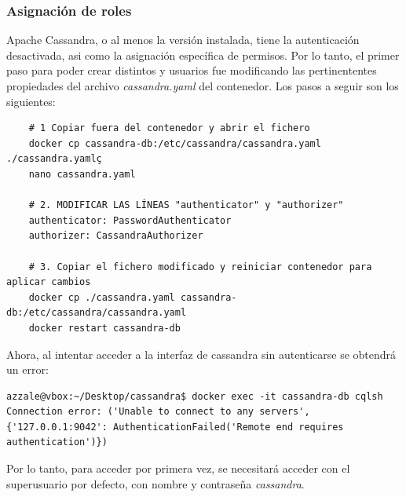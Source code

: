 \documentclass{article}
\begin{document}
\subsubsection{Asignación de roles}
Apache Cassandra, o al menos la versión instalada, tiene la autenticación desactivada, asi como la asignación específica de permisos. Por lo tanto, el primer paso para poder crear distintos y usuarios fue modificando las pertinententes propiedades del archivo \textit{cassandra.yaml} del contenedor. Los pasos a seguir son los siguientes:

\begin{lstlisting}
    # 1 Copiar fuera del contenedor y abrir el fichero
    docker cp cassandra-db:/etc/cassandra/cassandra.yaml ./cassandra.yamlç
    nano cassandra.yaml

    # 2. MODIFICAR LAS LÍNEAS "authenticator" y "authorizer"
    authenticator: PasswordAuthenticator
    authorizer: CassandraAuthorizer

    # 3. Copiar el fichero modificado y reiniciar contenedor para aplicar cambios
    docker cp ./cassandra.yaml cassandra-db:/etc/cassandra/cassandra.yaml
    docker restart cassandra-db
\end{lstlisting}

Ahora, al intentar acceder a la interfaz de cassandra sin autenticarse se obtendrá un error:
\begin{tcolorbox}[colback=black, coltext=white, fontupper=\ttfamily, title=Terminal]
\begin{verbatim}
azzale@vbox:~/Desktop/cassandra$ docker exec -it cassandra-db cqlsh
Connection error: ('Unable to connect to any servers', {'127.0.0.1:9042': AuthenticationFailed('Remote end requires authentication')})
\end{verbatim}
\end{tcolorbox}
Por lo tanto, para acceder por primera vez, se necesitará acceder con el superusuario por defecto, con nombre  y contraseña \textit{cassandra}. 
\\
\end{document}
